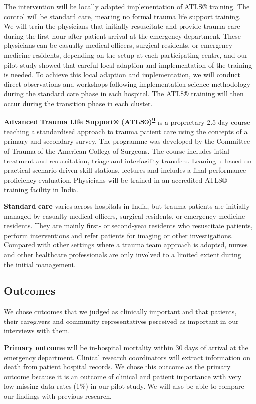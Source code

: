 \documentclass[
  11pt,
]{article}
\begin{document}
The intervention will be locally adapted implementation of ATLS® training. The control will be standard care, meaning no formal trauma life support training. We will train the physicians that initially resuscitate and provide trauma care during the first hour after patient arrival at the emergency department. These physicians can be casualty medical officers, surgical residents, or emergency medicine residents, depending on the setup at each participating centre, and our pilot study showed that careful local adaption and implementation of the training is needed. To achieve this local adaption and implementation, we will conduct direct observations and workshops following implementation science methodology during the standard care phase in each hospital. The ATLS® training will then occur during the transition phase in each cluster.

\textbf{Advanced Trauma Life Support® (ATLS®)\textsuperscript{\protect\hyperlink{ref-acsAtls2018}{9}}} is a proprietary 2.5 day course teaching a standardised approach to trauma patient care using the concepts of a primary and secondary survey. The programme was developed by the Committee of Trauma of the American College of Surgeons. The course includes intial treatment and resuscitation, triage and interfacility transfers. Leaning is based on practical scenario-driven skill stations, lectures and includes a final performance proficiency evaluation. Physicians will be trained in an accredited ATLS® training facility in India.

\textbf{Standard care} varies across hospitals in India, but trauma patients are initially managed by casualty medical officers, surgical residents, or emergency medicine residents. They are mainly first- or second-year residents who resuscitate patients, perform interventions and refer patients for imaging or other investigations. Compared with other settings where a trauma team approach is adopted, nurses and other healthcare professionals are only involved to a limited extent during the initial management.

\hypertarget{outcomes}{%
\subsection{Outcomes}\label{outcomes}}

We chose outcomes that we judged as clinically important and that patients, their caregivers and community representatives perceived as important in our interviews with them.

\textbf{Primary outcome} will be in-hospital mortality within 30 days of arrival at the emergency department. Clinical research coordinators will extract information on death from patient hospital records. We chose this outcome as the primary outcome because it is an outcome of clinical and patient importance with very low missing data rates (1\%) in our pilot study. We will also be able to compare our findings with previous research.
\end{document}

